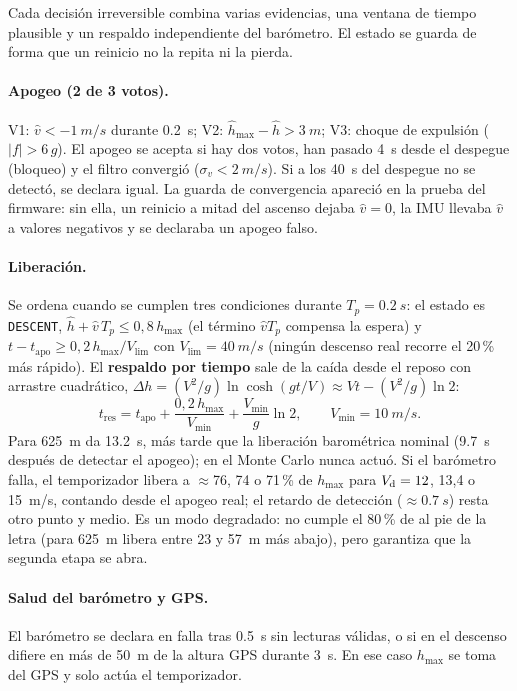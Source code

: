 Cada decisión irreversible combina varias evidencias, una ventana de tiempo plausible y un
respaldo independiente del barómetro. El estado se guarda de forma que un reinicio no la
repita ni la pierda.

\paragraph{Apogeo (2 de 3 votos).} V1: $\hat v<\SI{-1}{m/s}$ durante \SI{0.2}{s}; V2:
$\hat h_{\max}-\hat h>\SI{3}{m}$; V3: choque de expulsión ($|f|>6\,g$). El apogeo se
acepta si hay dos votos, han pasado \SI{4}{s} desde el despegue (bloqueo) y el filtro
convergió ($\sigma_v<\SI{2}{m/s}$). Si a los \SI{40}{s} del despegue no se detectó, se
declara igual. La guarda de
convergencia apareció en la prueba del firmware: sin ella, un reinicio a mitad del ascenso
dejaba $\hat v=0$, la IMU llevaba $\hat v$ a valores negativos y se declaraba un apogeo
falso.

\paragraph{Liberación.} Se ordena cuando se cumplen tres condiciones durante
$T_p=\SI{0.2}{s}$: el estado es \texttt{DESCENT}, $\hat h+\hat v\,T_p\le0{,}8\,h_{\max}$ (el
término $\hat vT_p$ compensa la espera) y
$t-t_{\mathrm{apo}}\ge0{,}2\,h_{\max}/V_{\lim}$ con $V_{\lim}=\SI{40}{m/s}$ (ningún descenso
real recorre el 20\,\% más rápido). El \textbf{respaldo por tiempo} sale de la caída desde
el reposo con arrastre cuadrático, $\Delta h=(V^2/g)\ln\cosh(gt/V)\approx Vt-(V^2/g)\ln2$:
\begin{equation}
  t_{\mathrm{res}} = t_{\mathrm{apo}} + \frac{0{,}2\,h_{\max}}{V_{\min}} + \frac{V_{\min}}{g}\ln2,
  \qquad V_{\min}=\SI{10}{m/s}.
  \label{eq:electronica-timer}
\end{equation}
Para \SI{625}{m} da \SI{13.2}{s}, más tarde que la liberación barométrica nominal
(\SI{9.7}{s} después de detectar el apogeo); en el Monte Carlo nunca actuó. Si el
barómetro falla, el temporizador libera a $\approx$76, 74 o 71\,\% de $h_{\max}$ para
$V_{\mathrm{d}}=12$, 13,4 o \SI{15}{m/s}, contando desde el apogeo real; el retardo de detección
($\approx\SI{0.7}{s}$) resta otro punto y medio. Es un modo degradado: no cumple el 80\,\% de  al
pie de la letra (para \SI{625}{m} libera entre 23 y \SI{57}{m} más abajo), pero garantiza
que la segunda etapa se abra.

\paragraph{Salud del barómetro y GPS.} El barómetro se declara en falla tras \SI{0.5}{s} sin
lecturas válidas, o si en el descenso difiere en más de \SI{50}{m} de la altura GPS durante
\SI{3}{s}. En ese caso $h_{\max}$ se toma del GPS y solo actúa el temporizador.

